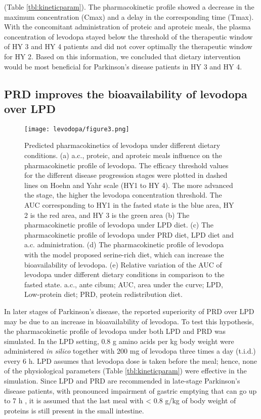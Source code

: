 (Table \ref{tbl:kineticparam}). The pharmacokinetic profile showed a decrease in the maximum concentration (Cmax) and a delay in the corresponding time (Tmax). With the concomitant administration of proteic and aproteic meals, the plasma concentration of levodopa stayed below the threshold of the therapeutic window of HY 3 and HY 4
patients and did not cover optimally the therapeutic window for HY 2. Based on this information, we concluded that dietary intervention would be most beneficial for Parkinson's disease patients in HY 3 and HY 4.
\subsection{PRD improves the bioavailability of levodopa over LPD}
\begin{figure}[!htp]
\centering
	\texttt{[image: levodopa/figure3.png]}%
	\caption[Predicted pharmacokinetics of levodopa under different
dietary conditions.]{Predicted pharmacokinetics of levodopa under different
dietary conditions. (a) a.c., proteic, and aproteic meals influence on
the pharmacokinetic profile of levodopa. The efficacy threshold
values for the different disease progression stages were plotted in
dashed lines on Hoehn and Yahr scale (HY1 to HY 4). The more
advanced the stage, the higher the levodopa concentration threshold.
The AUC corresponding to HY1 in the fasted state is the blue
area, HY 2 is the red area, and HY 3 is the green area (b) The
pharmacokinetic profile of levodopa under LPD diet. (c) The
pharmacokinetic profile of levodopa under PRD diet, LPD diet and
a.c. administration. (d) The pharmacokinetic profile of levodopa with
the model proposed serine-rich diet, which can increase the
bioavailability of levodopa. (e) Relative variation of the AUC of
levodopa under different dietary conditions in comparison to the
fasted state. a.c., ante cibum; AUC, area under the curve; LPD,
Low-protein diet; PRD, protein redistribution diet.}
	\label{fig:curves}
\end{figure}
In later stages of Parkinson's disease, the reported superiority of PRD over LPD may be due to an increase in bioavailability of levodopa. To test this hypothesis, the pharmacokinetic profile of levodopa under both LPD and PRD was simulated. In the LPD setting, 0.8 g amino acids per kg body weight were administered \textit{in silico} together with 200 mg of levodopa three times a day (t.i.d.) every 6 h. LPD
assumes that levodopa dose is taken before the meal; hence, none of the physiological parameters (Table \ref{tbl:kineticparam}) were effective in the simulation. Since LPD and PRD are recommended in late-stage Parkinson's disease patients, with pronounced impairment of gastric emptying that can go up to 7 h \cite{hardoff2001gastric}, it is assumed that the last meal with < 0.8 g/kg of body weight of proteins is still present in the small intestine. 
